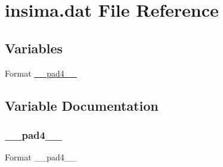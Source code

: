 \hypertarget{insima_8dat}{}\section{insima.\+dat File Reference}
\label{insima_8dat}
\subsection*{Variables}
\begin{DoxyCompactItemize}
\item 
Format \hyperlink{insima_8dat_a729cc061a9ce7fd15c1053aba75b410e}{\+\_\+\+\_\+pad4\+\_\+\+\_\+}
\end{DoxyCompactItemize}


\subsection{Variable Documentation}
\mbox{\label{insima_8dat_a729cc061a9ce7fd15c1053aba75b410e}} 
\subsubsection{\texorpdfstring{\+\_\+\+\_\+pad4\+\_\+\+\_\+}{\_\_pad4\_\_}}
{\footnotesize\ttfamily Format \+\_\+\+\_\+pad4\+\_\+\+\_\+}

